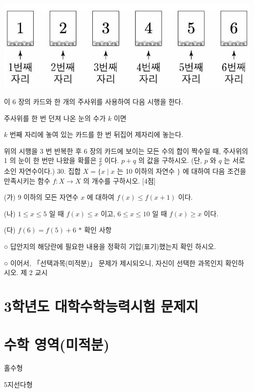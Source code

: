 \documentclass[10pt]{article}
\begin{document}
\begin{center}
\includegraphics[max width=\textwidth]{2023_06_06_b380aa8523ec7afae994g-12}
\end{center}

이 6 장의 카드와 한 개의 주사위를 사용하여 다음 시행을 한다.

주사위를 한 번 던져 나온 눈의 수가 $k$ 이면

$k$ 번째 자리에 놓여 있는 카드를 한 번 뒤집어 제자리에 놓는다.

위의 시행을 3 번 반복한 후 6 장의 카드에 보이는 모든 수의 합이 짝수일 때, 주사위의 1 의 눈이 한 번만 나왔을 확률은 $\frac{q}{p}$ 이다. $p+q$ 의 값을 구하시오. (단, $p$ 와 $q$ 는 서로소인 자연수이다.) 30. 집합 $X=\{x \mid x$ 는 10 이하의 자연수 $\}$ 에 대하여 다음 조건을 만족시키는 함수 $f: X \rightarrow X$ 의 개수를 구하시오. [4점]

(가) 9 이하의 모든 자연수 $x$ 에 대하여 $f(x) \leq f(x+1)$ 이다.

(나) $1 \leq x \leq 5$ 일 때 $f(x) \leq x$ 이고, $6 \leq x \leq 10$ 일 때 $f(x) \geq x$ 이다.

(다) $f(6)=f(5)+6$ $*$ 확인 사항

○ 답안지의 해당란에 필요한 내용을 정확히 기입(표기)했는지 확인 하시오.

○ 이어서, 「선택과목(미적분)」 문제가 제시되오니, 자신이 선택한 과목인지 확인하시오. 제 2 교시

\section{3학년도 대학수학능력시험 문제지}
\section{수학 영역(미적분)}
홀수형

5지선다형
\end{document}
